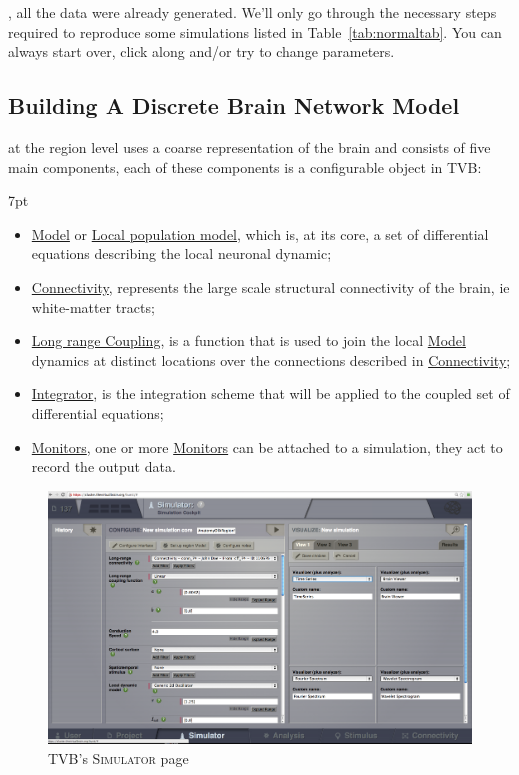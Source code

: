 \documentclass{tufte-handout}
\newenvironment{blah}{%
  \def\FrameCommand{%
    \hspace{1pt}%
    {\color{DarkOrange}\vrule width 2pt}%
    {\color{PeachPuff}\vrule width 4pt}%
    \colorbox{PeachPuff}%
  }%
  \MakeFramed{\advance\hsize-\width\FrameRestore}%
  \noindent\hspace{-4.55pt}%
  \begin{adjustwidth}{}{7pt}%
  \vspace{2pt}\vspace{2pt}%
}
{%
  \vspace{2pt}\end{adjustwidth}\endMakeFramed%
}
\begin{document}
, all the data were already generated. We'll only go through the necessary steps required to reproduce some simulations listed in Table~\ref{tab:normaltab}. You can always start over, click along and/or try to change parameters.


\subsection{Building A Discrete Brain Network Model}\label{sec:region_simulations}

 at the region level uses a coarse representation of the brain and consists of
five main components, each of these components is a configurable object in
TVB:
\begin{blah}
\begin{itemize}
\item \underline{Model} or \underline{Local population model}, which is, at its core, a set of differential equations describing the local neuronal dynamic;
\item \underline{Connectivity}, represents the large scale structural connectivity of the brain, ie white-matter tracts;
\item \underline{Long range Coupling}, is a function that is used to join the local \underline{Model} dynamics at distinct locations over the connections described in \underline{Connectivity};
\item \underline{Integrator}, is the integration scheme that will be applied to the coupled set of differential equations;
\item \underline{Monitors}, one or more \underline{Monitors} can be attached to a simulation, they act to record the output data.
\end{itemize}
\end{blah}

\begin{figure}[h]
  \includegraphics[width=\linewidth]{Handout_UI_BuildingYourOwnBrainNetworkModel_SimulatorArea}%
  \caption{TVB's \textsc{Simulator} page}%
  \label{fig:fig}%
\end{figure}
\end{document}
